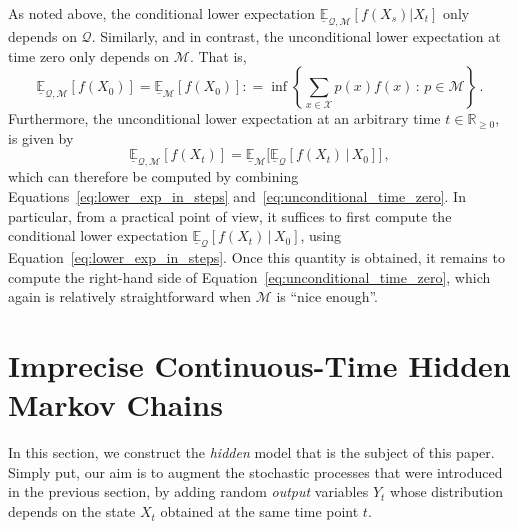 \documentclass[twoside,11pt]{article}
\newcommand{\reals}{\mathbb{R}}
\newcommand{\realsnonneg}{\reals_{\geq 0}}
\newcommand{\states}{\mathcal{X}}
\newcommand{\lexp}{\underline{\mathbb{E}}_{\rateset,\mathcal{M}}}
\newcommand{\rateset}{\mathcal{Q}}
\newcommand{\coloneqq}{:\!=}
\begin{document}
As noted above, the conditional lower expectation $\lexp[f(X_s)\vert X_t]$ only depends on $\rateset$. Similarly, and in contrast, the unconditional lower expectation at time zero only depends on $\mathcal{M}$. That is,
\begin{equation}\label{eq:unconditional_time_zero}
\lexp[f(X_0)] = \underline{\mathbb{E}}_{\mathcal{M}}[f(X_0)] \coloneqq \inf\left\{ \sum_{x\in\states}p(x)f(x)\,:\,p\in\mathcal{M} \right\}\,.
\end{equation}
Furthermore, the unconditional lower expectation at an arbitrary time $t\in\realsnonneg$, is given by
\begin{equation}\label{eq:unconditional_lower_exp}
\underline{\mathbb{E}}_{\rateset,\mathcal{M}}[f(X_t)] = \underline{\mathbb{E}}_{\mathcal{M}}\bigl[\underline{\mathbb{E}}_{\rateset}[f(X_t)\,\vert\,X_0]\bigr]\,,
\end{equation}
which can therefore be computed by combining Equations~\eqref{eq:lower_exp_in_steps} and~\eqref{eq:unconditional_time_zero}. In particular, from a practical point of view, it suffices to first compute the conditional lower expectation $\underline{\mathbb{E}}_{\rateset}[f(X_t)\,\vert\,X_0]$, using Equation~\eqref{eq:lower_exp_in_steps}. Once this quantity is obtained, it remains to compute the right-hand side of Equation~\eqref{eq:unconditional_time_zero}, which again is relatively straightforward when $\mathcal{M}$ is ``nice enough''.

\section{Imprecise Continuous-Time Hidden Markov Chains}\label{sec:icthmc}

In this section, we construct the \emph{hidden} model that is the subject of this paper. Simply put, our aim is to augment the stochastic processes that were introduced in the previous section, by adding random \emph{output} variables $Y_t$ whose distribution depends on the state $X_t$ obtained at the same time point $t$.

\end{document}
